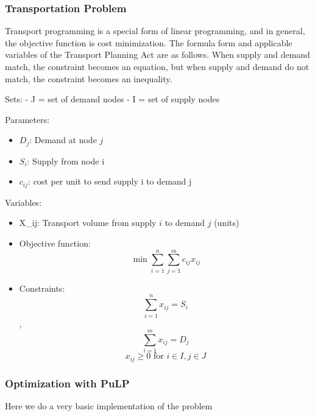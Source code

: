 

\hypertarget{transportation-problem}{%
\subsubsection{Transportation Problem}\label{transportation-problem}}

Transport programming is a special form of linear programming, and in
general, the objective function is cost minimization. The formula form
and applicable variables of the Transport Planning Act are as follows.
When supply and demand match, the constraint becomes an equation, but
when supply and demand do not match, the constraint becomes an
inequality.

Sets: - J = set of demand nodes - I = set of supply nodes

Parameters: 
\begin{itemize}
\item  $D_j$: Demand at node $j$ 
\item  $S_i$: Supply from node i 
\item  $c_{ij}$:
cost per unit to send supply i to demand j
\end{itemize}

Variables: 
\begin{itemize}
\item  X\_ij: Transport volume from supply \(i\) to demand \(j\)
(units)
\end{itemize}

\begin{itemize}
\item
  Objective function: \[\min \sum_{i=1}^n\sum_{j=1}^mc_{ij}x_{ij}\]
\item
  Constraints:
  \[\sum_{i=1}^nx_{ij}=S_i\],
  \[\sum_{i=1}^mx_{ij}=D_j\]
 \[ x_{ij}\geq 0 \text{ for } i \in I, j \in J\]
\end{itemize}

    \hypertarget{optimization-with-pulp}{%
\subsubsection{Optimization with PuLP}\label{optimization-with-pulp}}

Here we do a very basic implementation of the problem

